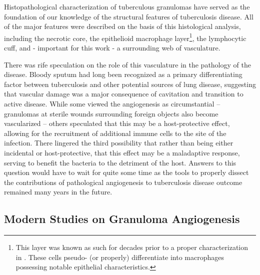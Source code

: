Histopathological characterization of tuberculous granulomas have served as the foundation of our knowledge of the structural features of tuberculosis disease. All of the major features were described on the basis of this histological analysis, including the necrotic core, the epithelioid macrophage layer\footnote{This layer was known as such for decades prior to a proper characterization in \citet{Cronan2016}. These cells pseudo- (or properly) differentiate into macrophages possessing notable epithelial characteristics.}, the lymphocytic cuff, and - important for this work - a surrounding web of vasculature. 

There was rife speculation on the role of this vasculature in the pathology of the disease. Bloody sputum had long been recognized as a primary differentiating factor between tuberculosis and other potential sources of lung disease, suggesting that vascular damage was a major consequence of cavitation and transition to active disease. While some viewed the angiogenesis as circumstantial -- granulomas at sterile wounds surrounding foreign objects also become vascularized -- others speculated that this may be a host-protective effect, allowing for the recruitment of additional immune cells to the site of the infection. There lingered the third possibility that rather than being either incidental or host-protective, that this effect may be a maladaptive response, serving to benefit the bacteria to the detriment of the host. Answers to this question would have to wait for quite some time as the tools to properly dissect the contributions of pathological angiogenesis to tuberculosis disease outcome remained many years in the future.

\subsection{Modern Studies on Granuloma Angiogenesis}\label{granang}

